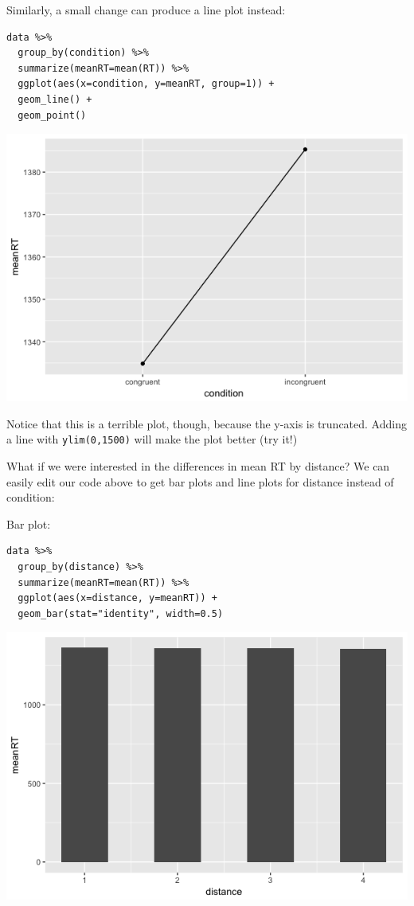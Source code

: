 \documentclass[11pt]{article}
\begin{document}
Similarly, a small change can produce a line plot instead:

\begin{verbatim}
data %>%
  group_by(condition) %>%
  summarize(meanRT=mean(RT)) %>%
  ggplot(aes(x=condition, y=meanRT, group=1)) +
  geom_line() +
  geom_point()
\end{verbatim}

\includegraphics[width=.9\linewidth]{figures/week5/lineplot1.png}

Notice that this is a terrible plot, though, because the y-axis is truncated.  Adding a line with \texttt{ylim(0,1500)} will make the plot better (try it!)

What if we were interested in the differences in mean RT by distance?  We can easily edit our code above to get bar plots and line plots for distance instead of condition:

Bar plot:

\begin{verbatim}
data %>%
  group_by(distance) %>%
  summarize(meanRT=mean(RT)) %>%
  ggplot(aes(x=distance, y=meanRT)) +
  geom_bar(stat="identity", width=0.5)
\end{verbatim}

\includegraphics[width=.9\linewidth]{figures/week5/barplot2.png}
\end{document}
